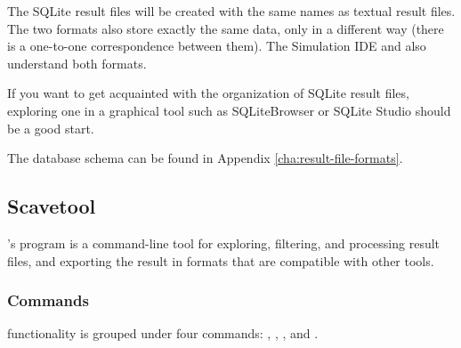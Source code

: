 The SQLite result files will be created with the same names as textual
result files. The two formats also store exactly the same data, only in
a different way (there is a one-to-one correspondence between them). The
Simulation IDE and  also understand both formats.

\begin{hint}
If you want to get acquainted with the organization of SQLite result
files, exploring one in a graphical tool such as SQLiteBrowser or SQLite
Studio should be a good start.
\end{hint}

The database schema can be found in Appendix \ref{cha:result-file-formats}.



\subsection{Scavetool}
\label{sec:ana-sim:scavetool}

{\opp}'s  program is a command-line tool for exploring,
filtering, and processing result files, and exporting the result in formats
that are compatible with other tools.

\subsubsection{Commands}
\label{sec:ana-sim:scavetool:commands}

 functionality is grouped under four commands:
, , , and .

